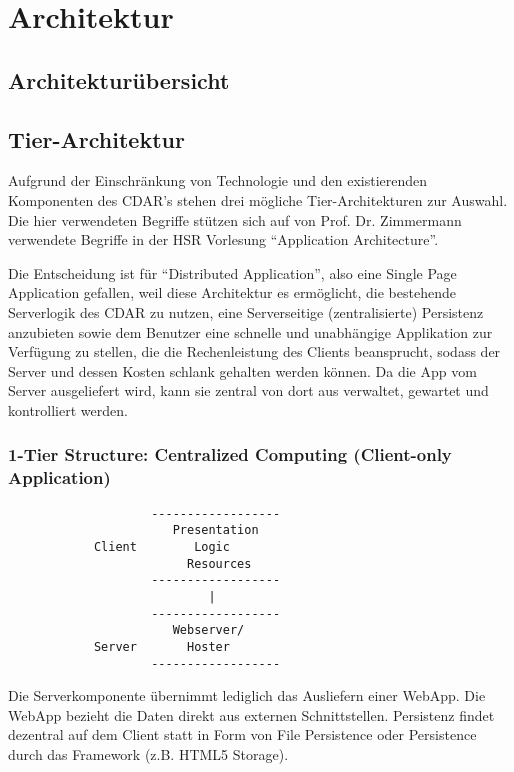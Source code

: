 \chapter{Architektur}
	\section{Architekturübersicht}
	
	
	\section{Tier-Architektur}
		Aufgrund der Einschränkung von Technologie und den existierenden Komponenten des CDAR's stehen drei mögliche Tier-Architekturen zur Auswahl.
		Die hier verwendeten Begriffe stützen sich auf von Prof. Dr. Zimmermann verwendete Begriffe in der HSR Vorlesung "`Application Architecture"'\cite{zio-AppArch-LayersMiddleware}.
	
		Die Entscheidung ist für "`Distributed Application"', also eine Single Page Application gefallen, 
		weil diese Architektur es ermöglicht, die bestehende Serverlogik des CDAR zu nutzen, 
		eine Serverseitige (zentralisierte) Persistenz anzubieten sowie dem Benutzer eine schnelle und unabhängige Applikation zur Verfügung zu stellen, die die Rechenleistung des Clients beansprucht, sodass der Server und dessen Kosten schlank gehalten werden können.
		Da die App vom Server ausgeliefert wird, kann sie zentral von dort aus verwaltet, gewartet und kontrolliert werden.
		
		\subsection{1-Tier Structure: Centralized Computing (Client-only Application)}
			\begin{verbatim}
			        ------------------
			           Presentation
			Client        Logic
			             Resources
			        ------------------
			                |
			        ------------------
			           Webserver/
			Server       Hoster	
			        ------------------		
			\end{verbatim}

			Die Serverkomponente übernimmt lediglich das Ausliefern einer WebApp. 
			Die WebApp bezieht die Daten direkt aus externen Schnittstellen. 
			Persistenz findet dezentral auf dem Client statt in Form von File Persistence oder 
			Persistence durch das Framework (z.B. HTML5 Storage).
	
